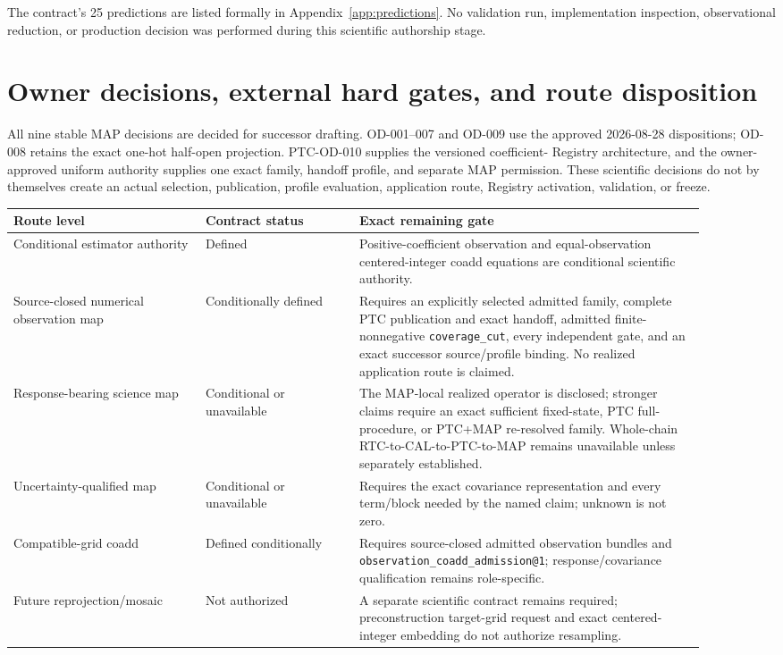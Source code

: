 \documentclass[10pt]{article}
\newcommand{\code}[1]{\nolinkurl{#1}}
\begin{document}
The contract's 25 predictions are listed formally in
Appendix~\ref{app:predictions}. No validation run, implementation inspection,
observational reduction, or production decision was performed during this
scientific authorship stage.

\clearpage
\section{Owner decisions, external hard gates, and route disposition}

All nine stable MAP decisions are decided for successor drafting. OD-001--007
and OD-009 use the approved 2026-08-28 dispositions; OD-008 retains the exact
one-hot half-open projection. PTC-OD-010 supplies the versioned coefficient-
Registry architecture, and the owner-approved uniform authority supplies one
exact family, handoff profile, and separate MAP permission. These scientific
decisions do not by themselves create an actual selection, publication,
profile evaluation, application route, Registry activation, validation, or
freeze.

\begin{longtable}{L{0.25\linewidth}L{0.20\linewidth}L{0.45\linewidth}}
\toprule
Route level & Contract status & Exact remaining gate\\
\midrule
Conditional estimator authority & Defined & Positive-coefficient observation and equal-observation centered-integer coadd equations are conditional scientific authority.\\
Source-closed numerical observation map & Conditionally defined & Requires an explicitly selected admitted family, complete PTC publication and exact handoff, admitted finite-nonnegative \code{coverage\_cut}, every independent gate, and an exact successor source/profile binding. No realized application route is claimed.\\
Response-bearing science map & Conditional or unavailable & The MAP-local realized operator is disclosed; stronger claims require an exact sufficient fixed-state, PTC full-procedure, or PTC+MAP re-resolved family. Whole-chain RTC-to-CAL-to-PTC-to-MAP remains unavailable unless separately established.\\
Uncertainty-qualified map & Conditional or unavailable & Requires the exact covariance representation and every term/block needed by the named claim; unknown is not zero.\\
Compatible-grid coadd & Defined conditionally & Requires source-closed admitted observation bundles and \code{observation\_coadd\_admission@1}; response/covariance qualification remains role-specific.\\
Future reprojection/mosaic & Not authorized & A separate scientific contract remains required; preconstruction target-grid request and exact centered-integer embedding do not authorize resampling.\\
\bottomrule
\end{longtable}
\end{document}
